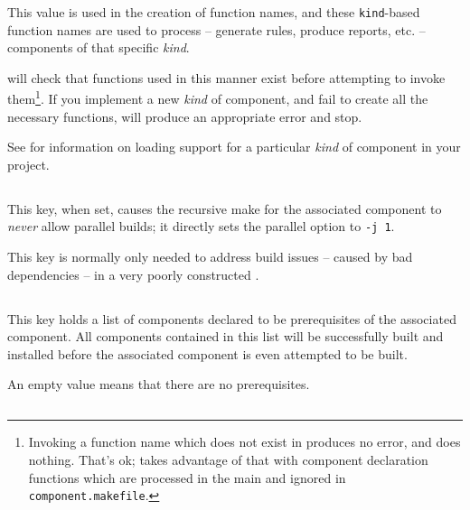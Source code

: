 This value is used in the creation of function names, and these
\texttt{kind}-based function names are used to process -- generate
rules, produce reports, etc. -- components of that specific
\emph{kind}.

\lmsbw will check that functions used in this manner exist before
attempting to invoke them\footnote{Invoking a function name which does
  not exist in \gnumake produces no error, and does nothing.  That's
  ok; \lmsbw takes advantage of that with component declaration
  functions which are processed in the main \makefile and ignored in
  \texttt{component.makefile}.}.  If you implement a new \emph{kind}
of component, and fail to create all the necessary functions, \lmsbw
will produce an appropriate error and stop.

See  for information on
loading support for a particular \emph{kind} of component in your
project.


\subsection{}\label{variables:no-parallel}

This key, when set, causes the recursive make for the associated
component to \emph{never} allow parallel builds; it directly sets the
\gnumake parallel option to \texttt{-j 1}.

This key is normally only needed to address build issues -- caused by
bad dependencies -- in a very poorly constructed \makefile.


\subsection{}\label{variables:prerequisite}

This key holds a list of components declared to be prerequisites of
the associated component.  All components contained in this list will
be successfully built and installed before the associated component is
even attempted to be built.

An empty value means that there are no prerequisites.


\subsection{}\label{variables:reason}

